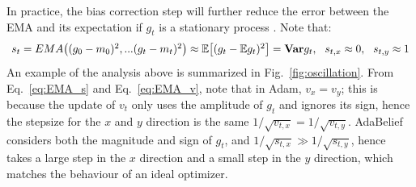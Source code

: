 \documentclass{article}
\begin{document}
\begin{minipage}{0.48\textwidth}
\centering
{}
\end{minipage}
\label{fig:oscillation}
\endgroup
In practice, the bias correction step will further reduce the error between the EMA and its expectation if $g_t$ is a stationary process \cite{kingma2014adam}. 
Note that:
\begin{equation}
\label{eq:EMA_v}
\scalebox{1.0}{
$
    s_t = EMA \big( (g_0 - m_0)^2, ... (g_t - m_t)^2 \big) \approx \mathbb{E} \big[ (g_t - \mathbb{E}g_t)^2 \big ] = \mathbf{Var} g_t,\ \ s_{t,x} \approx 0, \ \ s_{t,y} \approx 1
    $
    }
\end{equation}
An example of the analysis above is summarized in Fig.~\ref{fig:oscillation}. From Eq.~\ref{eq:EMA_s} and Eq.~\ref{eq:EMA_v}, note that in Adam, $v_x = v_y$; this is because the update of $v_t$ only uses the amplitude of $g_t$ and ignores its sign, hence the stepsize for the $x$ and $y$ direction is the same  $1/\sqrt{v_{t,x}}  = 1/\sqrt{v_{t,y}} $. AdaBelief considers both the magnitude and sign of $g_t$, and $1/\sqrt{s_{t,x}}  \gg 1/\sqrt{s_{t,y}}$, hence takes a large step in the $x$ direction and a small step in the $y$ direction, which matches the behaviour of an ideal optimizer. 
\end{document}
